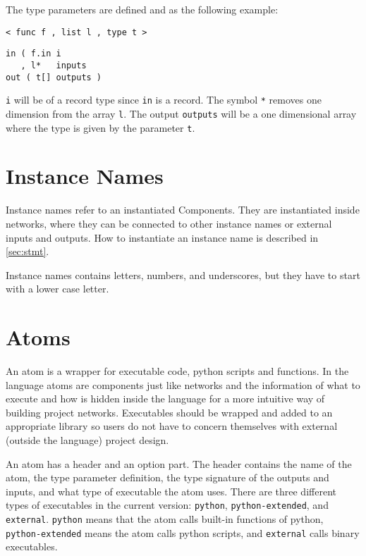 The type parameters are defined and as the following example:

\begin{verbatim}
< func f , list l , type t >
\end{verbatim}

\begin{verbatim}
in ( f.in i
   , l*   inputs
out ( t[] outputs )
\end{verbatim}

\verb#i# will be of a record type since \verb#in# is a record. The
symbol \verb#*# removes one dimension from the array \verb#l#. The
output \verb#outputs# will be a one dimensional array where the type
is given by the parameter \verb#t#.




\section{Instance Names}
Instance names refer to an instantiated Components. They are
instantiated inside networks, where they can be connected to other
instance names or external inputs and outputs. How to instantiate an
instance name is described in \autoref{sec:stmt}.

Instance names contains letters, numbers, and underscores, but they
have to start with a lower case letter.

\section{Atoms}\label{sec:atom}
An atom is a wrapper for executable code, python scripts and
functions. In the language atoms are components just like networks and
the information of what to execute and how is hidden inside the
language for a more intuitive way of building project
networks. Executables should be wrapped and added to an appropriate
library so users do not have to concern themselves with external
(outside the language) project design.

An atom has a header and an option part. The header contains the name
of the atom, the type parameter definition, the type signature of the
outputs and inputs, and what type of executable the atom uses. There
are three different types of executables in the current version:
\verb#python#, \verb#python-extended#, and
\verb#external#. \verb#python# means that the atom calls built-in
functions of python, \verb#python-extended# means the atom calls
python scripts, and \verb#external# calls binary executables.

